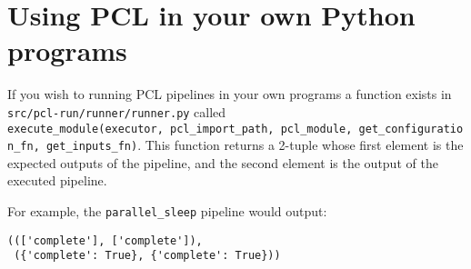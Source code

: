 \section{Using PCL in your own Python programs}
If you wish to running PCL pipelines in your own programs a function exists in \texttt{src/pcl-run/runner/runner.py} called \texttt{execute\_module(executor,\ pcl\_import\_path,\ pcl\_module,\ get\_configuration\_fn,\ get\_inputs\_fn)}. This function returns a 2-tuple whose first element is the expected outputs of the pipeline, and the second element is the output of the executed pipeline.

For example, the \texttt{parallel\_sleep} pipeline would output:
\begin{verbatim}
((['complete'], ['complete']),
 ({'complete': True}, {'complete': True}))
\end{verbatim}

